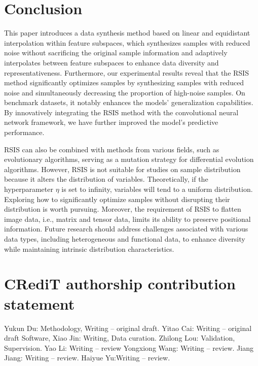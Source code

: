 \documentclass[final,3p,times]{elsarticle}
\begin{document}

\section{Conclusion}
This paper introduces a data synthesis method based on linear and 
equidistant interpolation within feature subspaces, which 
synthesizes samples with reduced noise without sacrificing 
the original sample information and adaptively interpolates 
between feature subspaces to enhance data diversity and 
representativeness. Furthermore, our experimental results reveal 
that the RSIS method significantly optimizes samples by 
synthesizing samples with reduced noise and simultaneously 
decreasing the proportion of high-noise samples. On benchmark 
datasets, it notably enhances the models' generalization 
capabilities. By innovatively integrating the RSIS method with 
the convolutional neural network framework, we have further 
improved the model's predictive performance.

{\color{myred}RSIS can also be combined with methods from various fields, such as evolutionary algorithms, serving as a mutation strategy for differential evolution algorithms.} However, RSIS is not suitable for studies on sample distribution because it alters 
the distribution of variables. Theoretically, if {\color{myred}the}
hyperparameter $\eta$ is set to infinity, variables will 
tend to a uniform distribution. Exploring how to significantly 
optimize samples without disrupting their distribution is worth 
pursuing. {\color{myred}Moreover, the requirement of RSIS to flatten image data, i.e., matrix and tensor data, limits its ability to preserve positional information. Future research should address challenges associated with various data types, including heterogeneous and functional data, to enhance diversity while maintaining intrinsic distribution characteristics.}



\section*{CRediT authorship contribution statement}
Yukun Du: Methodology, Writing – original draft. Yitao Cai: Writing – original draft
Software,  Xiao Jin: Writing, Data curation.   Zhilong Lou: Validation, Supervision.  Yao Li: Writing – review Yongxiong Wang: Writing – review. Jiang Jiang: Writing – review. Haiyue Yu:Writing – review.
\end{document}
